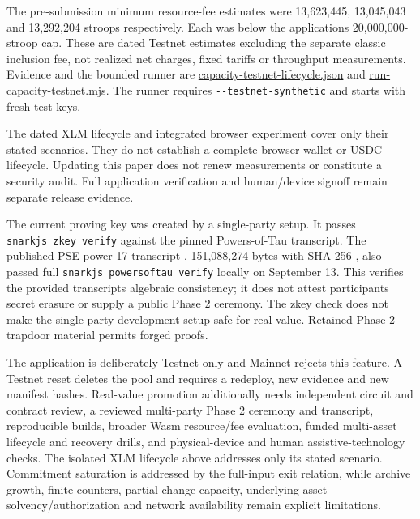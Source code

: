 \documentclass[11pt,letterpaper]{article}
\begin{document}
The pre-submission minimum resource-fee estimates were 13,623,445,
13,045,043 and 13,292,204 stroops respectively. Each was below the
application\textquotesingle s 20,000,000-stroop cap. These are dated
Testnet estimates excluding the separate classic inclusion fee, not
realized net charges, fixed tariffs or throughput measurements. Evidence
and the bounded runner are
\href{https://github.com/stellarchain/io.stellarkey/blob/v1.1.2/protocol/private-balance/results/capacity-testnet-lifecycle.json}{capacity-testnet-lifecycle.json}
and
\href{https://github.com/stellarchain/io.stellarkey/blob/v1.1.2/protocol/private-balance/spikes/scripts/run-capacity-testnet.mjs}{run-capacity-testnet.mjs}.
The runner requires \texttt{-\/-testnet-synthetic} and starts with fresh
test keys.

The dated XLM lifecycle and integrated browser experiment cover only
their stated scenarios. They do not establish a complete browser-wallet
or USDC lifecycle. Updating this paper does not renew measurements or
constitute a security audit. Full application verification and
human/\allowbreak{}device signoff remain separate release evidence.

The current proving key was created by a single-party setup. It passes
\texttt{snarkjs\ zkey\ verify} against the pinned Powers-of-Tau
transcript. The published PSE power-17 transcript \cite{ref9},
151,088,274 bytes with SHA-256
{\ttfamily{}},
also passed full \texttt{snarkjs\ powersoftau\ verify} locally on
September 13. This verifies the provided transcript\textquotesingle s
algebraic consistency; it does not attest participants\textquotesingle{}
secret erasure or supply a public Phase 2 ceremony. The zkey check does
not make the single-party development setup safe for real value.
Retained Phase 2 trapdoor material permits forged proofs.

The application is deliberately Testnet-only and Mainnet rejects this
feature. A Testnet reset deletes the pool and requires a redeploy, new
evidence and new manifest hashes. Real-value promotion additionally
needs independent circuit and contract review, a reviewed multi-party
Phase 2 ceremony and transcript, reproducible builds, broader Wasm
resource/\allowbreak{}fee evaluation, funded multi-asset lifecycle and
recovery drills, and physical-device and human assistive-technology
checks. The isolated XLM lifecycle above addresses only its stated
scenario. Commitment saturation is addressed by the full-input exit
relation, while archive growth, finite counters, partial-change
capacity, underlying asset solvency/\allowbreak{}authorization and
network availability remain explicit limitations.
\end{document}

